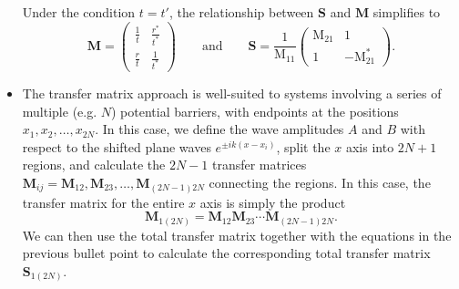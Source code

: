 \documentclass[11pt, a4paper]{article}
\newcommand{\mat}[1]{\mathbf{#1}}  %
\renewcommand{\SS}{\mat{S}}  %
\newcommand{\M}{\mat{M}}  %
\newcommand{\MM}{\mathrm{M}}  %
\begin{document}
\begin{itemize}
    Under the condition $ t = t' $, the relationship between $ \SS $ and $ \M $ simplifies to
    \begin{equation*}
        \M = 
        \begin{pmatrix}
            \frac{1}{t} & \frac{r^{*}}{t^{*}}\\[0.5mm]
            \frac{r}{t} & \frac{1}{t^{*}}
        \end{pmatrix}
        \qquad \text{and} \qquad \SS = \frac{1}{\MM_{11}}
        \begin{pmatrix}
            \MM_{21} & 1\\
            1 & - \MM_{21}^{*}
        \end{pmatrix}.
    \end{equation*}
    
    \item The transfer matrix approach is well-suited to systems involving a series of  multiple (e.g. $ N $) potential barriers, with endpoints at the positions $ x_{1}, x_{2}, \ldots, x_{2N}$. In this case, we define the wave amplitudes $ A $ and $ B $ with respect to the shifted plane waves $ e^{\pm i k(x - x_{i})} $, split the $ x $ axis into $ 2N + 1 $ regions, and calculate the $ 2N - 1 $ transfer matrices $ \M_{ij} = \M_{12}, \M_{23}, \ldots, \M_{(2N-1) 2N} $ connecting the regions. In this case, the transfer matrix for the entire $ x $ axis is simply the product
    \begin{equation*}
        \M_{1(2N)} = \M_{12}\M_{23} \cdots \M_{(2N-1)2N}.
    \end{equation*}
    We can then use the total transfer matrix together with the equations in the previous bullet point to calculate the corresponding total transfer matrix $ \SS_{1(2N)} $.

\end{itemize}
\end{document}
